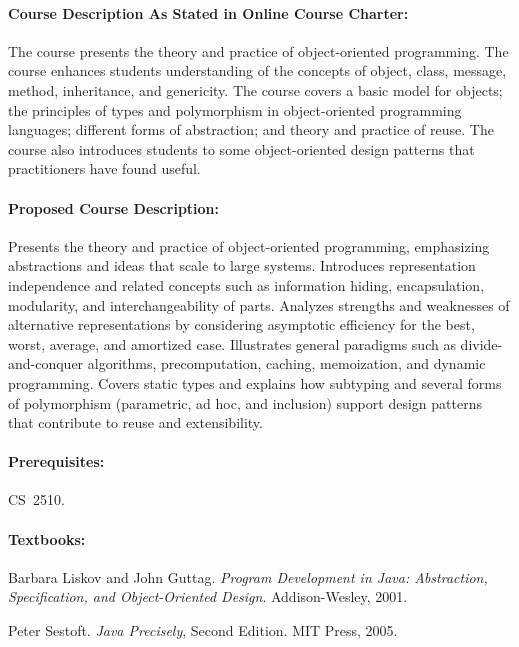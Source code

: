 \documentclass[11pt]{article}
\begin{document}
\paragraph{Course Description As Stated in Online Course Charter:}
%
The course presents the theory and practice of object-oriented
programming. The course enhances students understanding of the
concepts of object, class, message, method, inheritance, and
genericity. The course covers a basic model for objects; the
principles of types and polymorphism in object-oriented programming
languages; different forms of abstraction; and theory and practice
of reuse. The course also introduces students to some
object-oriented design patterns that practitioners have found useful. 

\paragraph{Proposed Course Description:}
%
Presents the theory and practice of object-oriented programming,
emphasizing abstractions and ideas that scale to large systems.
Introduces representation independence and related concepts such as
information hiding, encapsulation, modularity, and interchangeability
of parts.  Analyzes strengths and weaknesses of alternative
representations by considering asymptotic efficiency for the best,
worst, average, and amortized case.  Illustrates general paradigms
such as divide-and-conquer algorithms, precomputation, caching,
memoization, and dynamic programming.  Covers static types and
explains how subtyping and several forms of polymorphism
(parametric, ad hoc, and inclusion) support design patterns that
contribute to reuse and extensibility.

\paragraph{Prerequisites:}
%
CS~2510. 

\paragraph{Textbooks:}
%
\noindent
Barbara Liskov and John Guttag.
\emph{Program Development in Java: Abstraction, Specification,
and Object-Oriented Design}.
Addison-Wesley, 2001.

\noindent
Peter Sestoft.  \emph{Java Precisely}, Second Edition.
MIT Press, 2005.
\end{document}
